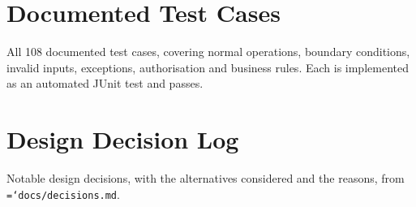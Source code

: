 \documentclass[11pt,a4paper]{article}
\newcommand{\code}[1]{\texttt{\hyphenchar\font=`\-\relax #1}}
\begin{document}
\section{Documented Test Cases}\label{app:tests}
All 108 documented test cases, covering normal operations, boundary conditions, invalid inputs, exceptions, authorisation and business rules. Each is implemented as an automated JUnit test and passes.
{\small}

\section{Design Decision Log}\label{app:decisions}
Notable design decisions, with the alternatives considered and the reasons, from \code{docs/decisions.md}.
{\small}
\end{document}
